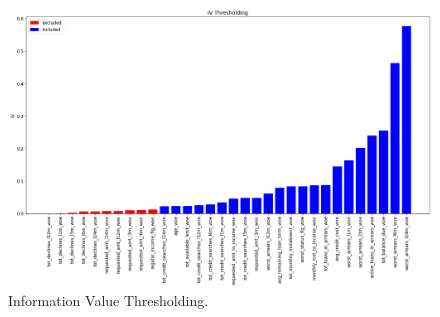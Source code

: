 \begin  {figure}[!htpb]
\centering
  \includegraphics[width=\linewidth]{Credit_Images/IV.png}
   \caption{Information Value Thresholding.}
    \label{fig-IV-Thresh}
\end{figure}

